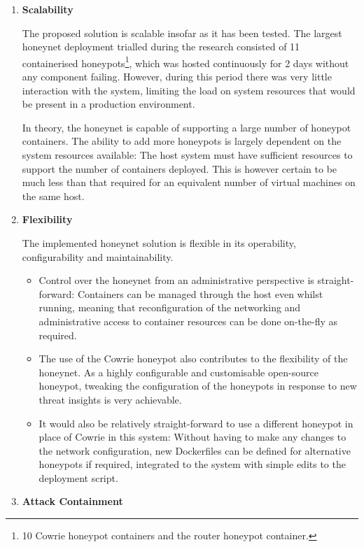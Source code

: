 \begin{enumerate}
\item \textbf{Scalability}

The proposed solution is scalable insofar as it has been tested. The largest honeynet deployment trialled during the research consisted of 11 containerised honeypots\footnote{10 Cowrie honeypot containers and the router honeypot container.}, which was hosted continuously for 2 days without any component failing. However, during this period there was very little interaction with the system, limiting the load on system resources that would be present in a production environment.

In theory, the honeynet is capable of supporting a large number of honeypot containers. The ability to add more honeypots is largely dependent on the system resources available: The host system must have sufficient resources to support the number of containers  deployed. This is however certain to be much less than that required for an equivalent number of virtual machines on the same host.
 
\item \textbf{Flexibility} 

The implemented honeynet solution is flexible in its operability, configurability and maintainability. 
\begin{itemize}
\item Control over the honeynet from an administrative perspective is straight-forward: Containers can be managed through the host even whilst running, meaning that reconfiguration of the networking and administrative access to container resources can be done on-the-fly as required.
\item The use of the Cowrie honeypot also contributes to the flexibility of the honeynet. As a highly configurable and customisable open-source honeypot, tweaking the configuration of the honeypots in response to new threat insights is very achievable. 
\item It would also be relatively straight-forward to use a different honeypot in place of Cowrie in this system: Without having to make any changes to the network configuration, new Dockerfiles can be defined for alternative honeypots if required, integrated to the system with simple edits to the deployment script.

\end{itemize}
\item \textbf{Attack Containment}


\end{enumerate}
